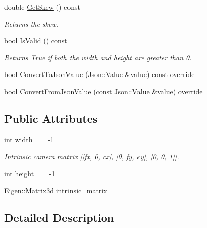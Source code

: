 \begin{DoxyCompactItemize}
double \mbox{\hyperlink{classopen3d_1_1camera_1_1_pinhole_camera_intrinsic_accab078a4c27093d472d2d24d81f207f}{Get\+Skew}} () const
\begin{DoxyCompactList}\small\item\em Returns the skew. \end{DoxyCompactList}\item 
bool \mbox{\hyperlink{classopen3d_1_1camera_1_1_pinhole_camera_intrinsic_a6aa462077d44464a0e0f7641e3539b8c}{Is\+Valid}} () const
\begin{DoxyCompactList}\small\item\em Returns True if both the width and height are greater than 0. \end{DoxyCompactList}\item 
bool \mbox{\hyperlink{classopen3d_1_1camera_1_1_pinhole_camera_intrinsic_ac66896c0b913a13760c70261f2765d66}{Convert\+To\+Json\+Value}} (Json\+::\+Value \&value) const override
\item 
bool \mbox{\hyperlink{classopen3d_1_1camera_1_1_pinhole_camera_intrinsic_a0b9d6853df2fd01aa3e9397c4d4c55a0}{Convert\+From\+Json\+Value}} (const Json\+::\+Value \&value) override
\end{DoxyCompactItemize}
\subsection*{Public Attributes}
\begin{DoxyCompactItemize}
\item 
int \mbox{\hyperlink{classopen3d_1_1camera_1_1_pinhole_camera_intrinsic_a1cd741802818785dcc04ca191c0f6b83}{width\+\_\+}} = -\/1
\begin{DoxyCompactList}\small\item\em Intrinsic camera matrix \mbox{[}\mbox{[}fx, 0, cx\mbox{]}, \mbox{[}0, fy, cy\mbox{]}, \mbox{[}0, 0, 1\mbox{]}\mbox{]}. \end{DoxyCompactList}\item 
int \mbox{\hyperlink{classopen3d_1_1camera_1_1_pinhole_camera_intrinsic_aaf44fcc20d3140dc0536cbe18063a88a}{height\+\_\+}} = -\/1
\item 
Eigen\+::\+Matrix3d \mbox{\hyperlink{classopen3d_1_1camera_1_1_pinhole_camera_intrinsic_aaec6ac584fd3b3cc97f21824cc3581bd}{intrinsic\+\_\+matrix\+\_\+}}
\end{DoxyCompactItemize}


\subsection{Detailed Description}


